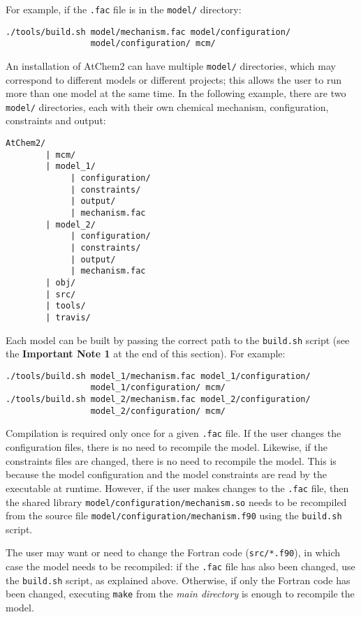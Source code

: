 For example, if the \texttt{.fac} file is in the \texttt{model/}
directory:

\begin{verbatim}
./tools/build.sh model/mechanism.fac model/configuration/
                 model/configuration/ mcm/
\end{verbatim}

An installation of AtChem2 can have multiple \texttt{model/}
directories, which may correspond to different models or different
projects; this allows the user to run more than one model at the same
time. In the following example, there are two \texttt{model/}
directories, each with their own chemical mechanism, configuration,
constraints and output:

\begin{verbatim}
AtChem2/
        | mcm/
        | model_1/
             | configuration/
             | constraints/
             | output/
             | mechanism.fac
        | model_2/
             | configuration/
             | constraints/
             | output/
             | mechanism.fac
        | obj/
        | src/
        | tools/
        | travis/
\end{verbatim}

Each model can be built by passing the correct path to the
\texttt{build.sh} script (see the \textbf{Important Note 1} at the end
of this section). For example:

\begin{verbatim}
./tools/build.sh model_1/mechanism.fac model_1/configuration/
                 model_1/configuration/ mcm/
./tools/build.sh model_2/mechanism.fac model_2/configuration/
                 model_2/configuration/ mcm/
\end{verbatim}

Compilation is required only once for a given \texttt{.fac} file. If
the user changes the configuration files, there is no need to
recompile the model. Likewise, if the constraints files are changed,
there is no need to recompile the model. This is because the model
configuration and the model constraints are read by the executable at
runtime. However, if the user makes changes to the \texttt{.fac} file,
then the shared library \texttt{model/configuration/mechanism.so}
needs to be recompiled from the source file
\texttt{model/configuration/mechanism.f90} using the \texttt{build.sh}
script.

The user may want or need to change the Fortran code
(\texttt{src/*.f90}), in which case the model needs to be recompiled:
if the \texttt{.fac} file has also been changed, use the
\texttt{build.sh} script, as explained above. Otherwise, if only the
Fortran code has been changed, executing \texttt{make} from the
\emph{main directory} is enough to recompile the model.

